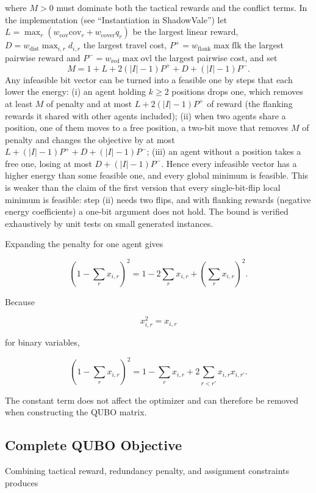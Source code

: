 \documentclass[12pt, a4paper]{article}
\begin{document}
where $M>0$ must dominate both the tactical rewards and the conflict terms. In the implementation (see ``Instantiation in ShadowVale'') let $L=\max_r(w_{\text{cov}}\mathrm{cov}_r+w_{\text{cover}}q_r)$ be the largest linear reward, $D=w_{\text{dist}}\max_{i,r}d_{i,r}$ the largest travel cost, $P^+=w_{\text{flank}}\max\mathrm{flk}$ the largest pairwise reward and $P^-=w_{\text{red}}\max\mathrm{ovl}$ the largest pairwise cost, and set
$$
M = 1 + L + 2(|I|-1)P^+ + D + (|I|-1)P^- .
$$
Any infeasible bit vector can be turned into a feasible one by steps that each lower the energy: (i) an agent holding $k\ge 2$ positions drops one, which removes at least $M$ of penalty and at most $L+2(|I|-1)P^+$ of reward (the flanking rewards it shared with other agents included); (ii) when two agents share a position, one of them moves to a free position, a two-bit move that removes $M$ of penalty and changes the objective by at most $L+(|I|-1)P^+ + D+(|I|-1)P^-$; (iii) an agent without a position takes a free one, losing at most $D+(|I|-1)P^-$. Hence every infeasible vector has a higher energy than some feasible one, and every global minimum is feasible. This is weaker than the claim of the first version that every single-bit-flip local minimum is feasible: step (ii) needs two flips, and with flanking rewards (negative energy coefficients) a one-bit argument does not hold. The bound is verified exhaustively by unit tests on small generated instances.

Expanding the penalty for one agent gives

$$
\left(
1-\sum_r x_{i,r}
\right)^2
=
1
-
2\sum_r x_{i,r}
+
\left(\sum_r x_{i,r}\right)^2.
$$

Because

$$
x_{i,r}^2=x_{i,r}
$$

for binary variables,

$$
\left(
1-\sum_r x_{i,r}
\right)^2
=
1
-
\sum_r x_{i,r}
+
2\sum_{r<r'}x_{i,r}x_{i,r'}.
$$

The constant term does not affect the optimizer and can therefore be removed when constructing the QUBO matrix.

\subsection*{Complete QUBO Objective}

Combining tactical reward, redundancy penalty, and assignment constraints produces
\end{document}

